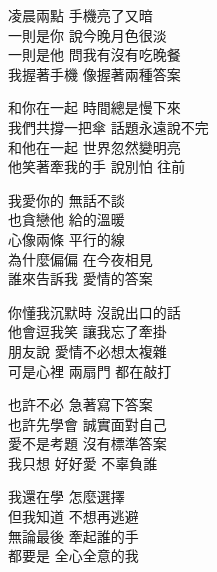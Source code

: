 \begin{lyrics}
\begin{chinese}
凌晨兩點 手機亮了又暗\\
一則是你 說今晚月色很淡\\
一則是他 問我有沒有吃晚餐\\
我握著手機 像握著兩種答案
\end{chinese}

\begin{chinese}
和你在一起 時間總是慢下來\\
我們共撐一把傘 話題永遠說不完\\
和他在一起 世界忽然變明亮\\
他笑著牽我的手 說別怕 往前
\end{chinese}

\begin{chinese}
我愛你的 無話不談\\
也貪戀他 給的溫暖\\
心像兩條 平行的線\\
為什麼偏偏 在今夜相見\\
誰來告訴我 愛情的答案
\end{chinese}

\begin{chinese}
你懂我沉默時 沒說出口的話\\
他會逗我笑 讓我忘了牽掛\\
朋友說 愛情不必想太複雜\\
可是心裡 兩扇門 都在敲打
\end{chinese}

\begin{chinese}
也許不必 急著寫下答案\\
也許先學會 誠實面對自己\\
愛不是考題 沒有標準答案\\
我只想 好好愛 不辜負誰
\end{chinese}

\begin{chinese}
我還在學 怎麼選擇\\
但我知道 不想再逃避\\
無論最後 牽起誰的手\\
都要是 全心全意的我
\end{chinese}
\end{lyrics}

